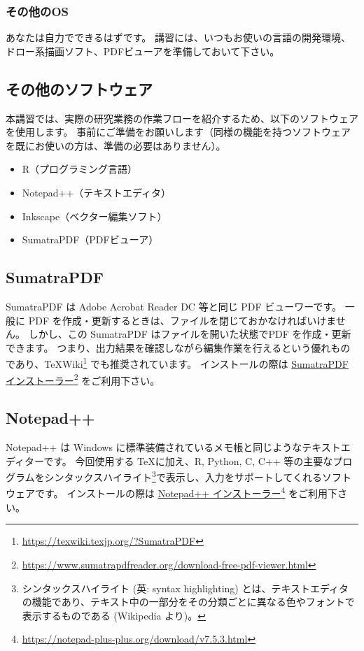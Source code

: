 \documentclass[TeXworkshop]{subfiles}
\begin{document}
\subsubsection*{その他のOS}
あなたは自力でできるはずです。
講習には、いつもお使いの言語の開発環境、ドロー系描画ソフト、PDFビューアを準備しておいて下さい。

\subsection*{その他のソフトウェア}
本講習では、実際の研究業務の作業フローを紹介するため、以下のソフトウェアを使用します。
事前にご準備をお願いします（同様の機能を持つソフトウェアを既にお使いの方は、準備の必要はありません）。
\begin{itemize}
\item R（プログラミング言語）
\item Notepad++（テキストエディタ）
\item Inkscape（ベクター編集ソフト）
\item SumatraPDF（PDFビューア）
\end{itemize}
\subsection*{SumatraPDF}
SumatraPDF は Adobe Acrobat Reader DC 等と同じ PDF ビューワーです。
一般に PDF を作成・更新するときは、ファイルを閉じておかなければいけません。
しかし、この SumatraPDF はファイルを開いた状態でPDF を作成・更新できます。
つまり、出力結果を確認しながら編集作業を行えるという優れものであり、\TeX Wiki\footnote{\url{https://texwiki.texjp.org/?SumatraPDF}} でも推奨されています。
インストールの際は \href{https://www.sumatrapdfreader.org/download-free-pdf-viewer.html}{SumatraPDF インストーラー}\footnote{\url{https://www.sumatrapdfreader.org/download-free-pdf-viewer.html}} をご利用下さい。





\subsection*{Notepad++}
Notepad++ は Windows に標準装備されているメモ帳と同じようなテキストエディターです。
今回使用する \TeX に加え、R, Python, C, C++ 等の主要なプログラムをシンタックスハイライト\footnote{シンタックスハイライト (英: syntax highlighting) とは、テキストエディタの機能であり、テキスト中の一部分をその分類ごとに異なる色やフォントで表示するものである (Wikipedia より)。}で表示し、入力をサポートしてくれるソフトウェアです。
インストールの際は \href{https://notepad-plus-plus.org/download/v7.5.3.html}{Notepad++ インストーラー}\footnote{\url{https://notepad-plus-plus.org/download/v7.5.3.html}} をご利用下さい。
\end{document}
